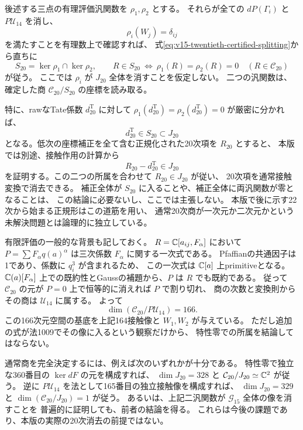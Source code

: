 後述する三点の有理評価汎関数を $\rho_1,\rho_2$ とする。
それらが全ての $dP(\Gamma_i)$ と $P\mathcal U_{14}$ を消し、
\[
                  \rho_i(W_j)=\delta_{ij}
\]
を満たすことを有理数上で確認すれば、
式\eqref{eq:v15-twentieth-certified-splitting}から直ちに
\[
 S_{20}=\ker\rho_1\cap\ker\rho_2,\qquad
 R\in S_{20}\ \Longleftrightarrow\
       \rho_1(R)=\rho_2(R)=0\quad(R\in\mathcal C_{20})
 \tag{20rho}\label{eq:v15-twentieth-subspace-detection}
\]
が従う。
ここでは $\rho_i$ が $J_{20}$ 全体を消すことを仮定しない。
二つの汎関数は、確定した商 $\mathcal C_{20}/S_{20}$ の座標を読み取る。

特に、rawなTate係数 $d_{20}^{\mathrm T}$ に対して
$\rho_1(d_{20}^{\mathrm T})=\rho_2(d_{20}^{\mathrm T})=0$ が厳密に分かれば、
\[
                    d_{20}^{\mathrm T}\in S_{20}\subset J_{20}
\]
となる。低次の座標補正を全て含む正規化された20次項を $R_{20}$ とすると、
本版では別途、接触作用の計算から
\[
                         R_{20}-d_{20}^{\mathrm T}\in J_{20}
\]
を証明する。この二つの所属を合わせて $R_{20}\in J_{20}$ が従い、
20次項を通常接触変換で消去できる。
補正全体が $S_{20}$ に入ることや、補正全体に両汎関数が零となることは、
この結論に必要ないし、ここでは主張しない。
本版で後に示す22次から始まる正規形はこの道筋を用い、
通常20次商が一次元か二次元かという未解決問題とは論理的に独立している。

有限評価の一般的な背景も記しておく。
$R=\mathbb C[a_{ij},F_\alpha]$ において
$P=\sum F_\alpha q(a)^\alpha$ は三次係数 $F_\alpha$ に関する一次式である。
Pfaffianの共通因子は1であり、係数に $q_i^3$ が含まれるため、
この一次式は $\mathbb C[a]$ 上primitiveとなる。
$\mathbb C(a)[F_\alpha]$ 上での既約性とGaussの補題から、$P$ は $R$ でも既約である。
従って $\mathcal C_{20}$ の元が $P=0$ 上で恒等的に消えれば $P$ で割り切れ、
商の次数と変換則からその商は $\mathcal U_{14}$ に属する。
よって
\[
                       \dim(\mathcal C_{20}/P\mathcal U_{14})=166.
\]
この166次元空間の基底を上記164接触像と $W_1,W_2$ が与えている。
ただし追加の式が法1009でその像に入るという観察だけから、
特性零での所属を結論してはならない。

\begin{remark}[残る一方向の問題]
通常商を完全決定するには、例えば次のいずれかが十分である。
特性零で独立な360番目の $\ker dF$ の元を構成すれば、
$\dim J_{20}=328$ と $\mathcal C_{20}/J_{20}\simeq\mathbb C^2$ が従う。
逆に $P\mathcal U_{14}$ を法として165番目の独立接触像を構成すれば、
$\dim J_{20}=329$ と $\dim(\mathcal C_{20}/J_{20})=1$ が従う。
あるいは、上記二汎関数が $\mathcal G_{15}$ 全体の像を消すことを
普遍的に証明しても、前者の結論を得る。
これらは今後の課題であり、本版の実際の20次消去の前提ではない。
\end{remark}

